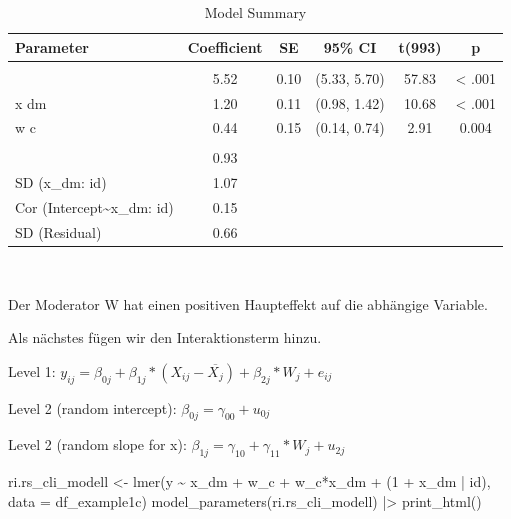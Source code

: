 \documentclass[
  letterpaper,
  DIV=11,
  numbers=noendperiod]{scrreprt}
\newenvironment{Shaded}{\begin{snugshade}}{\end{snugshade}}
\newcommand{\AttributeTok}[1]{\textcolor[rgb]{0.40,0.45,0.13}{#1}}
\newcommand{\DecValTok}[1]{\textcolor[rgb]{0.68,0.00,0.00}{#1}}
\newcommand{\FunctionTok}[1]{\textcolor[rgb]{0.28,0.35,0.67}{#1}}
\newcommand{\NormalTok}[1]{\textcolor[rgb]{0.00,0.23,0.31}{#1}}
\newcommand{\OtherTok}[1]{\textcolor[rgb]{0.00,0.23,0.31}{#1}}
\newcommand{\SpecialCharTok}[1]{\textcolor[rgb]{0.37,0.37,0.37}{#1}}
\begin{document}
\begin{table}
\caption*{
{\large Model Summary}
} 
\fontsize{12.0pt}{14.4pt}\selectfont
\begin{tabular*}{\linewidth}{@{\extracolsep{\fill}}lccccc}
\toprule
Parameter & Coefficient & SE & 95\% CI & t(993) & p \\ 
\midrule\addlinespace[2.5pt]
\multicolumn{6}{l}{{\slshape Fixed Effects }} \\[2.5pt] 
\midrule\addlinespace[2.5pt]
{(Intercept)} & 5.52 & 0.10 & (5.33, 5.70) & 57.83 & < .001 \\ 
{x dm} & 1.20 & 0.11 & (0.98, 1.42) & 10.68 & < .001 \\ 
{w c} & 0.44 & 0.15 & (0.14, 0.74) & 2.91 & 0.004  \\ 
\midrule\addlinespace[2.5pt]
\multicolumn{6}{l}{{\slshape Random Effects }} \\[2.5pt] 
\midrule\addlinespace[2.5pt]
{SD (Intercept: id)} & 0.93 &  &  &  &  \\ 
{SD (x\_dm: id)} & 1.07 &  &  &  &  \\ 
{Cor (Intercept\textasciitilde{}x\_dm: id)} & 0.15 &  &  &  &  \\ 
{SD (Residual)} & 0.66 &  &  &  &  \\ 
\bottomrule
\end{tabular*}
\begin{minipage}{\linewidth}
\\
\end{minipage}
\end{table}

Der Moderator W hat einen positiven Haupteffekt auf die abhängige
Variable.

Als nächstes fügen wir den Interaktionsterm hinzu.

Level 1:
\(y_{ij} = \beta_{0j} + \beta_{1j}*(X_{ij}-\overline{X_j}) + \beta_{2j}*W_{j} + e_{ij}\)

Level 2 (random intercept): \(\beta_{0j} = \gamma_{00} + u_{0j}\)

Level 2 (random slope for x):
\(\beta_{1j} = \gamma_{10} + \gamma_{11}*W_{j} + u_{2j}\)

\begin{Shaded}
\begin{Highlighting}[]
\NormalTok{ri.rs\_cli\_modell }\OtherTok{\textless{}{-}} \FunctionTok{lmer}\NormalTok{(y }\SpecialCharTok{\textasciitilde{}}\NormalTok{ x\_dm }\SpecialCharTok{+}\NormalTok{ w\_c }\SpecialCharTok{+}\NormalTok{ w\_c}\SpecialCharTok{*}\NormalTok{x\_dm }\SpecialCharTok{+}\NormalTok{ (}\DecValTok{1} \SpecialCharTok{+}\NormalTok{ x\_dm }\SpecialCharTok{|}\NormalTok{ id), }\AttributeTok{data =}\NormalTok{ df\_example1c)}
\FunctionTok{model\_parameters}\NormalTok{(ri.rs\_cli\_modell) }\SpecialCharTok{|\textgreater{}} \FunctionTok{print\_html}\NormalTok{()}
\end{Highlighting}
\end{Shaded}
\end{document}
